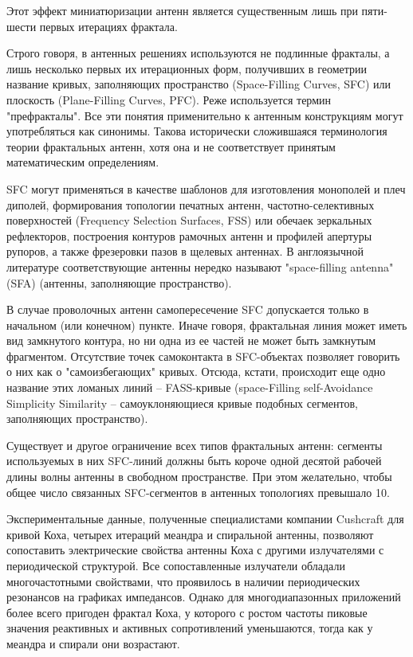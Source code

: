 Этот эффект миниатюризации антенн является существенным лишь при пяти-шести первых итерациях фрактала.

Строго говоря, в антенных решениях используются не подлинные фракталы, а лишь несколько первых их итерационных форм, получивших в геометрии название кривых, заполняющих пространство (Space-Filling Curves, SFC) или плоскость (Plane-Filling Curves, PFC). Реже используется термин "префракталы". Все эти понятия применительно к антенным конструкциям могут употребляться как синонимы. Такова исторически сложившаяся терминология теории фрактальных антенн, хотя она и не соответствует принятым математическим определениям.

SFC могут применяться в качестве шаблонов для изготовления монополей и плеч диполей, формирования топологии печатных антенн, частотно-селективных поверхностей (Frequency Selection Surfaces, FSS) или обечаек зеркальных рефлекторов, построения контуров рамочных антенн и профилей апертуры рупоров, а также фрезеровки пазов в щелевых антеннах. В англоязычной литературе соответствующие антенны нередко называют "space-filling antenna" (SFA) (антенны, заполняющие пространство).

В случае проволочных антенн самопересечение SFC допускается только в начальном (или конечном) пункте. Иначе говоря, фрактальная линия может иметь вид замкнутого контура, но ни одна из ее частей не может быть замкнутым фрагментом. Отсутствие точек самоконтакта в SFC-объектах позволяет говорить о них как о "самоизбегающих" кривых. Отсюда, кстати, происходит еще одно название этих ломаных линий – FASS-кривые (space-Filling self-Avoidance Simplicity Similarity – самоуклоняющиеся кривые подобных сегментов, заполняющих пространство).

Существует и другое ограничение всех типов фрактальных антенн: сегменты используемых в них SFC-линий должны быть короче одной десятой рабочей длины волны антенны в свободном пространстве. При этом желательно, чтобы общее число связанных SFC-сегментов в антенных топологиях превышало 10.

Экспериментальные данные, полученные специалистами компании Cushcraft для кривой Коха, четырех итераций меандра и спиральной антенны, позволяют сопоставить электрические свойства антенны Коха с другими излучателями с периодической структурой. Все сопоставленные излучатели обладали многочастотными свойствами, что проявилось в наличии периодических резонансов на графиках импедансов. Однако для многодиапазонных приложений более всего пригоден фрактал Коха, у которого с ростом частоты пиковые значения реактивных и активных сопротивлений уменьшаются, тогда как у меандра и спирали они возрастают.

